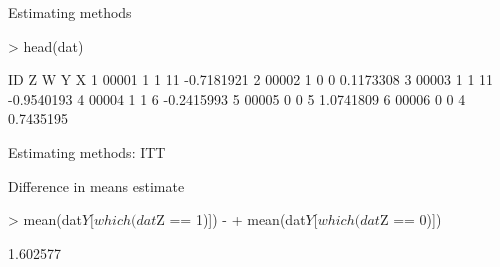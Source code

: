 \documentclass[xcolor={dvipsnames},handout]{beamer}
\begin{document}

\begin{frame}[fragile]{Estimating methods}

\begin{Schunk}
\begin{Sinput}
> head(dat)
\end{Sinput}
\begin{Soutput}
     ID Z W  Y          X
1 00001 1 1 11 -0.7181921
2 00002 1 0  0  0.1173308
3 00003 1 1 11 -0.9540193
4 00004 1 1  6 -0.2415993
5 00005 0 0  5  1.0741809
6 00006 0 0  4  0.7435195
\end{Soutput}
\end{Schunk}



\end{frame}



\begin{frame}[fragile]{Estimating methods: ITT}

Difference in means estimate
\begin{Schunk}
\begin{Sinput}
> mean(dat$Y[which(dat$Z == 1)]) -
+   mean(dat$Y[which(dat$Z == 0)])
\end{Sinput}
\begin{Soutput}
[1] 1.602577
\end{Soutput}
\end{Schunk}



\end{frame}


\end{document}
